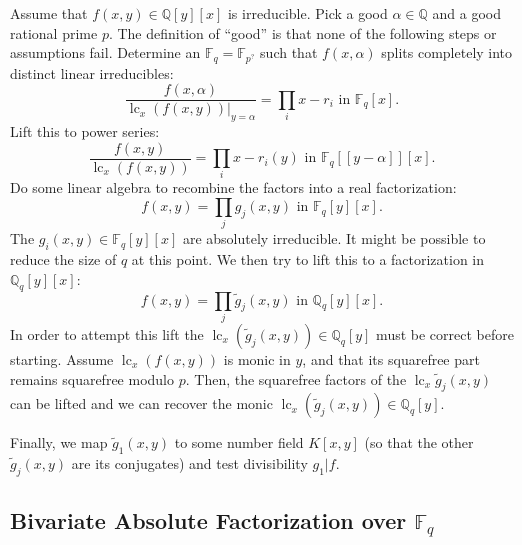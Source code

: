 \documentclass[11pt,reqno]{amsart}
\numberwithin{equation}{section}
\begin{document}
Assume that $f(x,y) \in \mathbb{Q}[y][x]$ is irreducible. Pick a good $\alpha
\in \mathbb{Q}$ and a good rational prime $p$. The definition of ``good'' is
that none of the following steps or assumptions fail. Determine an
$\mathbb{F}_q = \mathbb{F}_{p^?}$ such that $f(x,\alpha)$ splits completely
into distinct linear irreducibles:
\begin{equation*}
\frac{f(x,\alpha)}{\operatorname{lc}_x(f(x,y)) |_{y=\alpha}} = \prod_i x - r_i
\text{ in } \mathbb{F}_q[x]\text{.}
\end{equation*}
Lift this to power series:
\begin{equation*}
\frac{f(x,y)}{\operatorname{lc}_x(f(x,y))} = \prod_i x - r_i(y) \text{ in }
\mathbb{F}_q[[y-\alpha]][x]\text{.}
\end{equation*}
Do some linear algebra to recombine the factors into a real factorization:
\begin{equation*}
f(x,y) = \prod_j g_j(x,y) \text{ in } \mathbb{F}_q[y][x]\text{.}
\end{equation*}
The $g_i(x,y) \in \mathbb{F}_q[y][x]$ are absolutely irreducible. It might be
possible to reduce the size of $q$ at this point. We then try to lift this to a
factorization in $\mathbb{Q}_q[y][x]$:
\begin{equation*}
f(x,y) = \prod_j \widetilde{g}_j(x,y) \text{ in } \mathbb{Q}_q[y][x]\text{.}
\end{equation*}
In order to attempt this lift the $\operatorname{lc}_x(\widetilde{g}_j(x,y)) \in
\mathbb{Q}_q[y]$ must be correct before starting. Assume
$\operatorname{lc}_x(f(x,y))$ is monic in $y$, and that its squarefree part
remains squarefree modulo $p$. Then, the squarefree factors of the
$\operatorname{lc}_x \widetilde{g}_j(x,y)$ can be lifted and we can recover the
monic $\operatorname{lc}_x(\widetilde{g}_j(x,y)) \in \mathbb{Q}_q[y]$.

Finally, we map $\widetilde{g}_1(x,y)$ to some number field $K[x,y]$ (so that
the other $\widetilde{g}_j(x,y)$ are its conjugates) and test divisibility
$g_1|f$.

\subsection{Bivariate Absolute Factorization over $\mathbb{F}_q$}
\end{document}
